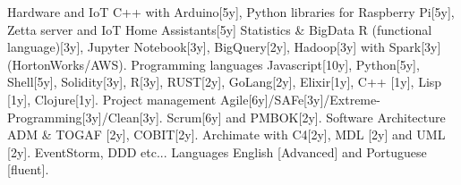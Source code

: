 \begin{cvskills}
	\cvskill
	{Hardware and IoT} %
	{ C++ with Arduino[5y], Python libraries for Raspberry Pi[5y], Zetta server and IoT Home Assistants[5y]} %
	\cvskill
	{Statistics \& BigData} %
	{ R (functional language)[3y], Jupyter Notebook[3y], BigQuery[2y], Hadoop[3y] with Spark[3y] (HortonWorks/AWS).} %
	\cvskill
	{Programming languages} %
	{Javascript[10y], Python[5y], Shell[5y], Solidity[3y], R[3y], RUST[2y], GoLang[2y], Elixir[1y], C++ [1y], Lisp [1y], Clojure[1y].} %
	\cvskill
	{Project management} %
	{Agile[6y]/SAFe[3y]/Extreme-Programming[3y]/Clean[3y]. Scrum[6y] and PMBOK[2y].} %
	\cvskill
	{Software Architecture} %
	{ADM \& TOGAF [2y], COBIT[2y]. Archimate with C4[2y], MDL [2y] and UML [2y]. EventStorm, DDD etc...} %
	\cvskill
	{Languages} %
	{English [Advanced] and Portuguese [fluent].} %
\end{cvskills}
